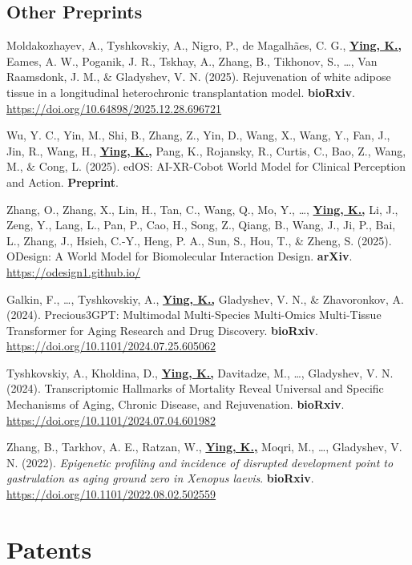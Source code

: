 \documentclass[
  11pt,
]
{article}
\begin{document}
\subsection{Other Preprints}\label{other-preprints}

Moldakozhayev, A., Tyshkovskiy, A., Nigro, P., de Magalhães, C. G.,
\textbf{\underline{Ying, K.,}} Eames, A. W., Poganik, J. R., Tskhay, A.,
Zhang, B., Tikhonov, S., \ldots, Van Raamsdonk, J. M., \& Gladyshev, V.
N. (2025). Rejuvenation of white adipose tissue in a longitudinal
heterochronic transplantation model. \textbf{bioRxiv}.
\url{https://doi.org/10.64898/2025.12.28.696721}

Wu, Y. C., Yin, M., Shi, B., Zhang, Z., Yin, D., Wang, X., Wang, Y.,
Fan, J., Jin, R., Wang, H., \textbf{\underline{Ying, K.,}} Pang, K.,
Rojansky, R., Curtis, C., Bao, Z., Wang, M., \& Cong, L. (2025). edOS:
AI-XR-Cobot World Model for Clinical Perception and Action.
\textbf{Preprint}.

Zhang, O., Zhang, X., Lin, H., Tan, C., Wang, Q., Mo, Y., \ldots,
\textbf{\underline{Ying, K.,}} Li, J., Zeng, Y., Lang, L., Pan, P., Cao,
H., Song, Z., Qiang, B., Wang, J., Ji, P., Bai, L., Zhang, J., Hsieh,
C.-Y., Heng, P. A., Sun, S., Hou, T., \& Zheng, S. (2025). ODesign: A
World Model for Biomolecular Interaction Design. \textbf{arXiv}.
\url{https://odesign1.github.io/}

Galkin, F., \ldots, Tyshkovskiy, A., \textbf{\underline{Ying, K.,}}
Gladyshev, V. N., \& Zhavoronkov, A. (2024). Precious3GPT: Multimodal
Multi-Species Multi-Omics Multi-Tissue Transformer for Aging Research
and Drug Discovery. \textbf{bioRxiv}.
\url{https://doi.org/10.1101/2024.07.25.605062}

Tyshkovskiy, A., Kholdina, D., \textbf{\underline{Ying, K.,}} Davitadze,
M., \ldots, Gladyshev, V. N. (2024). Transcriptomic Hallmarks of
Mortality Reveal Universal and Specific Mechanisms of Aging, Chronic
Disease, and Rejuvenation. \textbf{bioRxiv}.
\url{https://doi.org/10.1101/2024.07.04.601982}

Zhang, B., Tarkhov, A. E., Ratzan, W., \textbf{\underline{Ying, K.,}}
Moqri, M., \ldots, Gladyshev, V. N. (2022). \emph{Epigenetic profiling
and incidence of disrupted development point to gastrulation as aging
ground zero in Xenopus laevis}. \textbf{bioRxiv}.
\url{https://doi.org/10.1101/2022.08.02.502559}

\section{Patents}\label{patents}
\end{document}
